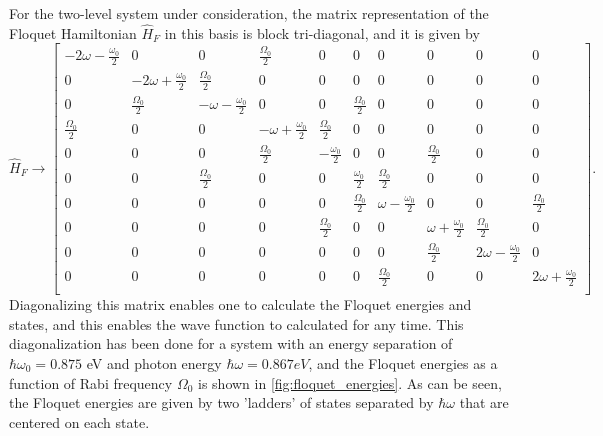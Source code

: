 For the two-level system under consideration, the matrix representation of the Floquet Hamiltonian $\hat{H}_F$ in this basis is block tri-diagonal, and it is given by
\begin{equation}
\label{eqn:Floquet_2_level}
	\hat{H}_F \rightarrow
	\left[
	\begin{smallmatrix}%
	-2 \omega-\frac{\omega_0}{2} & 0 & 0 & \frac{\Omega_0}{2} & 0 & 0 & 0 & 0 & 0 & 0 \\
	0 & -2 \omega +\frac{\omega_0}{2} & \frac{\Omega_0}{2} & 0 & 0 & 0 & 0 & 0 & 0 & 0 \\%
	0 & \frac{\Omega_0}{2} & -\omega-\frac{\omega_0}{2} & 0 & 0 & \frac{\Omega_0}{2} & 0 & 0 & 0
	& 0 \\
	\frac{\Omega_0}{2} & 0 & 0 & -\omega + \frac{\omega_0}{2} & \frac{\Omega_0}{2} & 0 & 0 & 0 & 0 &
	0 \\ %
	0 & 0 & 0 & \frac{\Omega_0}{2} & -\frac{\omega_0}{2} & 0 & 0 & \frac{\Omega_0}{2} & 0 &
	0 \\
	0 & 0 & \frac{\Omega_0}{2} & 0 & 0 & \frac{\omega_0}{2} & \frac{\Omega_0}{2} & 0 & 0 & 0
	\\ %
	0 & 0 & 0 & 0 & 0 & \frac{\Omega_0}{2} & \omega-\frac{\omega_0}{2} & 0 & 0 &
	\frac{\Omega_0}{2} \\
	0 & 0 & 0 & 0 & \frac{\Omega_0}{2} & 0 & 0 & \omega+\frac{\omega_0}{2} & \frac{\Omega_0}{2} &
	0 \\ %
	0 & 0 & 0 & 0 & 0 & 0 & 0 & \frac{\Omega_0}{2} & 2 \omega-\frac{\omega_0}{2} & 0 \\
	0 & 0 & 0 & 0 & 0 & 0 & \frac{\Omega_0}{2} & 0 & 0 & 2 \omega+\frac{\omega_0}{2} \\
	\end{smallmatrix}
	\right].
\end{equation}
Diagonalizing this matrix enables one to calculate the Floquet energies and states, and this enables the wave function to calculated for any time.  This diagonalization has been done for a system with an energy separation of $\hbar\omega_0=0.875$ eV and photon energy $\hbar\omega=0.867 eV$, and the Floquet energies as a function of Rabi frequency $\Omega_0$ is shown in \ref{fig:floquet_energies}. As can be seen, the Floquet energies are given by two 'ladders' of states separated by $\hbar\omega$ that are centered on each state.

